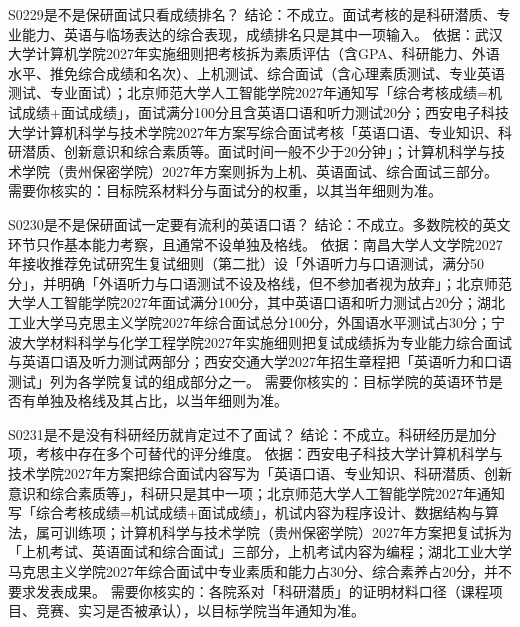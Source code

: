 \begin{qa}{S0229}{是不是保研面试只看成绩排名？}
结论：不成立。面试考核的是科研潜质、专业能力、英语与临场表达的综合表现，成绩排名只是其中一项输入。
依据：武汉大学计算机学院2027年实施细则把考核拆为素质评估（含GPA、科研能力、外语水平、推免综合成绩和名次）、上机测试、综合面试（含心理素质测试、专业英语测试、专业面试）；北京师范大学人工智能学院2027年通知写「综合考核成绩=机试成绩+面试成绩」，面试满分100分且含英语口语和听力测试20分；西安电子科技大学计算机科学与技术学院2027年方案写综合面试考核「英语口语、专业知识、科研潜质、创新意识和综合素质等。面试时间一般不少于20分钟」；计算机科学与技术学院（贵州保密学院）2027年方案则拆为上机、英语面试、综合面试三部分。
需要你核实的：目标院系材料分与面试分的权重，以其当年细则为准。
\end{qa}

\begin{qa}{S0230}{是不是保研面试一定要有流利的英语口语？}
结论：不成立。多数院校的英文环节只作基本能力考察，且通常不设单独及格线。
依据：南昌大学人文学院2027年接收推荐免试研究生复试细则（第二批）设「外语听力与口语测试，满分50分」，并明确「外语听力与口语测试不设及格线，但不参加者视为放弃」；北京师范大学人工智能学院2027年面试满分100分，其中英语口语和听力测试占20分；湖北工业大学马克思主义学院2027年综合面试总分100分，外国语水平测试占30分；宁波大学材料科学与化学工程学院2027年实施细则把复试成绩拆为专业能力综合面试与英语口语及听力测试两部分；西安交通大学2027年招生章程把「英语听力和口语测试」列为各学院复试的组成部分之一。
需要你核实的：目标学院的英语环节是否有单独及格线及其占比，以当年细则为准。
\end{qa}

\begin{qa}{S0231}{是不是没有科研经历就肯定过不了面试？}
结论：不成立。科研经历是加分项，考核中存在多个可替代的评分维度。
依据：西安电子科技大学计算机科学与技术学院2027年方案把综合面试内容写为「英语口语、专业知识、科研潜质、创新意识和综合素质等」，科研只是其中一项；北京师范大学人工智能学院2027年通知写「综合考核成绩=机试成绩+面试成绩」，机试内容为程序设计、数据结构与算法，属可训练项；计算机科学与技术学院（贵州保密学院）2027年方案把复试拆为「上机考试、英语面试和综合面试」三部分，上机考试内容为编程；湖北工业大学马克思主义学院2027年综合面试中专业素质和能力占30分、综合素养占20分，并不要求发表成果。
需要你核实的：各院系对「科研潜质」的证明材料口径（课程项目、竞赛、实习是否被承认），以目标学院当年通知为准。
\end{qa}

